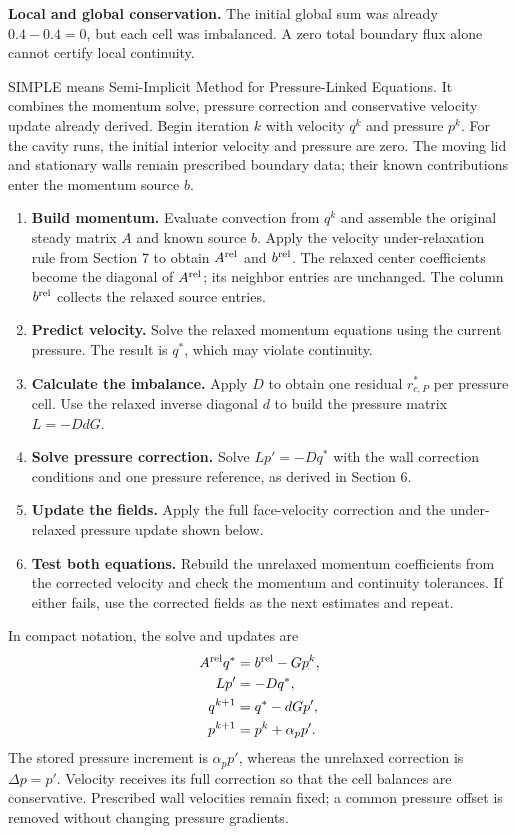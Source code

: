 \textbf{Local and global conservation.} The initial global sum was already $0.4-0.4=0$, but each cell was imbalanced. A zero total boundary flux alone cannot certify local continuity.
\newpage

\newpage
{}
SIMPLE means Semi-Implicit Method for Pressure-Linked Equations. It combines
the momentum solve, pressure correction and conservative velocity update
already derived. Begin iteration $k$ with velocity $q^k$ and pressure $p^k$.
For the cavity runs, the initial interior velocity and pressure are zero.
The moving lid and stationary walls remain prescribed boundary data; their
known contributions enter the momentum source $b$.

\begin{enumerate}
\item \textbf{Build momentum.} Evaluate convection from $q^k$ and assemble
the original steady matrix $A$ and known source $b$. Apply the velocity
under-relaxation rule from Section 7 to obtain $A^{\rm rel}$ and $b^{\rm rel}$.
The relaxed center coefficients become the diagonal of $A^{\rm rel}$; its
neighbor entries are unchanged. The column $b^{\rm rel}$ collects the relaxed
source entries.
\item \textbf{Predict velocity.} Solve the relaxed momentum equations using
the current pressure. The result is $q^*$, which may violate continuity.
\item \textbf{Calculate the imbalance.} Apply $D$ to obtain one residual
$r_{c,P}^*$ per pressure cell. Use the relaxed inverse diagonal $d$ to build
the pressure matrix $L=-DdG$.
\item \textbf{Solve pressure correction.} Solve $Lp'=-Dq^*$ with the wall
correction conditions and one pressure reference, as derived in Section 6.
\item \textbf{Update the fields.} Apply the full face-velocity correction
and the under-relaxed pressure update shown below.
\item \textbf{Test both equations.} Rebuild the unrelaxed momentum coefficients
from the corrected velocity and check the momentum and continuity tolerances.
If either fails, use the corrected fields as the next estimates and repeat.
\end{enumerate}
In compact notation, the solve and updates are
\begin{align*}
A^{\rm rel}q^*&=b^{\rm rel}-Gp^k,\\
Lp'&=-Dq^*,\\
q^{k+1}&=q^*-dGp',\\
p^{k+1}&=p^k+\alpha_p p'.
\end{align*}
The stored pressure increment is $\alpha_p p'$, whereas the unrelaxed
correction is $\Delta p=p'$. Velocity receives its full correction so that
the cell balances are conservative. Prescribed wall velocities remain fixed;
a common pressure offset is removed without changing pressure gradients.

